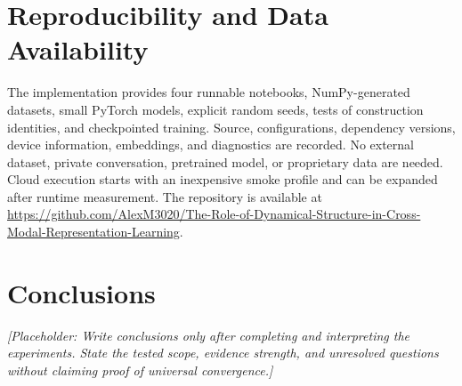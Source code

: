 \documentclass[11pt,a4paper]{article}
\newcommand{\placeholder}[1]{\par\medskip\noindent\textit{[Placeholder: #1]}\par\medskip}
\begin{document}
\section{Reproducibility and Data Availability}
The implementation provides four runnable notebooks, NumPy-generated datasets, small PyTorch models, explicit random seeds, tests of construction identities, and checkpointed training. Source, configurations, dependency versions, device information, embeddings, and diagnostics are recorded. No external dataset, private conversation, pretrained model, or proprietary data are needed. Cloud execution starts with an inexpensive smoke profile and can be expanded after runtime measurement. The repository is available at \url{https://github.com/AlexM3020/The-Role-of-Dynamical-Structure-in-Cross-Modal-Representation-Learning}.

\section{Conclusions}
\placeholder{Write conclusions only after completing and interpreting the experiments. State the tested scope, evidence strength, and unresolved questions without claiming proof of universal convergence.}
\end{document}

